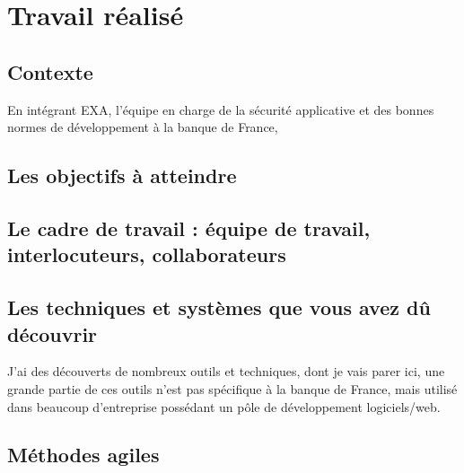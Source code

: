 \documentclass{report}
\begin{document}
\chapter{Travail réalisé}
\section{Contexte}
En intégrant EXA, l'équipe en charge de la sécurité applicative et des bonnes normes de développement à la banque de France,


\section{Les objectifs à atteindre}

\section{Le cadre de travail : équipe de travail, interlocuteurs, collaborateurs}

\section{Les techniques et systèmes que vous avez dû découvrir}
J'ai des découverts de nombreux outils et techniques, dont je vais parer ici, une grande partie de ces outils n'est pas spécifique à la banque de France, mais utilisé dans beaucoup d'entreprise possédant un pôle de développement logiciels/web.

\section{Méthodes agiles}
\end{document}
